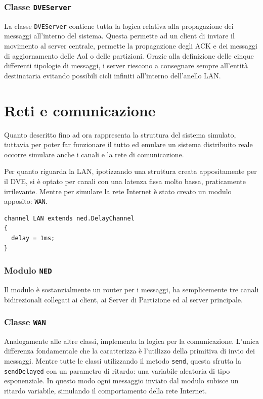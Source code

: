 \documentclass[a4paper, 11pt, oneside]{book}
\theoremstyle{definition}
\theoremstyle{remark}
\begin{document}
\subsubsection{Classe \texttt{DVEServer}}
La classe \texttt{DVEServer} contiene tutta la logica relativa alla propagazione
dei messaggi all'interno del sistema. Questa permette ad un client di inviare
il movimento al server centrale, permette la propagazione degli ACK e dei
messaggi di aggiornamento delle AoI o delle partizioni.
Grazie alla definizione delle cinque differenti tipologie di messaggi, i server
riescono a consegnare sempre all'entità destinataria evitando
possibili cicli infiniti all'interno dell'anello LAN.

\section{Reti e comunicazione}
Quanto descritto fino ad ora rappresenta la struttura del sistema simulato,
tuttavia per poter far funzionare il tutto ed emulare un sistema distribuito
reale occorre simulare anche i canali e la rete di comunicazione.

Per quanto riguarda la LAN, ipotizzando una struttura creata appositamente
per il DVE, si è optato per canali con una latenza fissa molto bassa,
praticamente irrilevante. Mentre per simulare la rete Internet è stato creato
un modulo apposito: \texttt{WAN}.
\begin{lstlisting}
channel LAN extends ned.DelayChannel
{
  delay = 1ms;
}
\end{lstlisting}

\subsubsection{Modulo \texttt{NED}}
Il modulo è sostanzialmente un router per i messaggi, ha semplicemente tre
canali bidirezionali collegati ai client, ai Server di Partizione ed al server
principale.
\subsubsection{Classe \texttt{WAN}}
Analogamente alle altre classi, implementa la logica per la comunicazione.
L'unica differenza fondamentale che la caratterizza è l'utilizzo della
primitiva di invio dei messaggi. Mentre tutte le classi utilizzando il metodo
\texttt{send}, questa sfrutta la \texttt{sendDelayed} con un parametro
di ritardo: una variabile aleatoria di tipo esponenziale.
In questo modo ogni messaggio inviato dal
modulo subisce un ritardo variabile, simulando il comportamento della rete
Internet.
\end{document}
